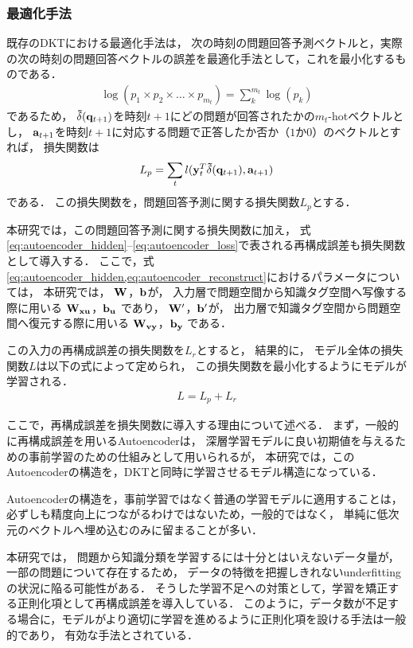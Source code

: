 \subsubsection{最適化手法}
既存のDKTにおける最適化手法は，
次の時刻の問題回答予測ベクトルと，実際の次の時刻の問題回答ベクトルの誤差を最適化手法として，これを最小化するものである．
\begin{eqnarray}
\label{eq:log_sum}
{\log(p_1 \times p_2 \times \dots \times p_{m_t}) = \sum_{k}^{m_t} \log(p_k)}
\end{eqnarray}
であるため，
${\bf\tilde{ \delta}}({\bf q}_{t+1})$を時刻$t+1$にどの問題が回答されたかの$m_t$-hotベクトルとし，
${\bf a}_{t+1}$を時刻$t+1$に対応する問題で正答したか否か（$1$か$0$）のベクトルとすれば，
損失関数は
\begin{eqnarray}
\label{eq:prediction_entropy}
{L_p = \sum_t l({\bf y}_t^T {\bf \tilde{\delta}}({\bf q}_{t+1}), {\bf a}_{t+1})}
\end{eqnarray}
である．
この損失関数を，問題回答予測に関する損失関数$L_p$とする．


本研究では，この問題回答予測に関する損失関数に加え，
式\ref{eq:autoencoder_hidden}--\ref{eq:autoencoder_loss}で表される再構成誤差も損失関数として導入する．
ここで，式\ref{eq:autoencoder_hidden,eq:autoencoder_reconstruct}におけるパラメータについては，
本研究では，
${\bf W}$，${\bf b}$が，
入力層で問題空間から知識タグ空間へ写像する際に用いる
${\bf W_{xu}}$，${\bf b_u}$
であり，
${\bf W'}$，${\bf b'}$が，
出力層で知識タグ空間から問題空間へ復元する際に用いる
${\bf W_{vy}}$，${\bf b_y}$
である．

この入力の再構成誤差の損失関数を$L_r$とすると，
結果的に，
モデル全体の損失関数$L$は以下の式によって定められ，
この損失関数を最小化するようにモデルが学習される．
\begin{eqnarray}
\label{eq:total_loss}
{L = L_p + L_r}
\end{eqnarray}


ここで，再構成誤差を損失関数に導入する理由について述べる．
まず，一般的に再構成誤差を用いるAutoencoderは，
深層学習モデルに良い初期値を与えるための事前学習のための仕組みとして用いられるが，
本研究では，このAutoencoderの構造を，DKTと同時に学習させるモデル構造になっている．

Autoencoderの構造を，事前学習ではなく普通の学習モデルに適用することは，
必ずしも精度向上につながるわけではないため，一般的ではなく，
単純に低次元のベクトルへ埋め込むのみに留まることが多い．

本研究では，
問題から知識分類を学習するには十分とはいえないデータ量が，一部の問題について存在するため，
データの特徴を把握しきれないunderfittingの状況に陥る可能性がある．
そうした学習不足への対策として，学習を矯正する正則化項として再構成誤差を導入している．
このように，データ数が不足する場合に，モデルがより適切に学習を進めるように正則化項を設ける手法は一般的であり，
有効な手法とされている．

